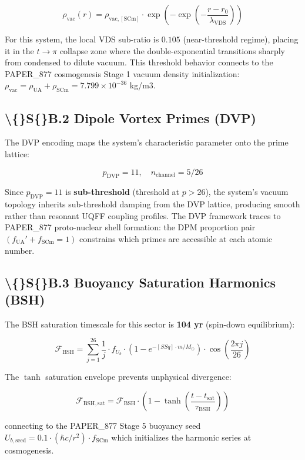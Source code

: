 \documentclass[11pt]{article}
\begin{document}
$$\rho_{\mathrm{vac}}(r) = \rho_{\mathrm{vac,[SCm]}} \cdot \exp\!\left(-\exp\!\left(-\frac{r - r_0}{\lambda_{\mathrm{VDS}}}\right)\right)$$

For this system, the local VDS sub-ratio is $0.105$ (near-threshold regime), placing it in the $t \to \pi$ collapse zone where the double-exponential transitions sharply from condensed to dilute vacuum. This threshold behavior connects to the PAPER\_877 cosmogenesis Stage 1 vacuum density initialization: $\rho_{\mathrm{vac}} = \rho_{\mathrm{UA}} + \rho_{\mathrm{SCm}} = 7.799 \times 10^{-36}$ kg/m3.

\subsection*{\textbackslash\{\}S\{\}B.2 Dipole Vortex Primes (DVP)}

The DVP encoding maps the system's characteristic parameter onto the prime lattice:

$$p_{\mathrm{DVP}} = 11, \quad n_{\mathrm{channel}} = 5/26$$

Since $p_{\mathrm{DVP}} = 11$ is \textbf{sub-threshold} (threshold at $p > 26$), the system's vacuum topology inherits sub-threshold damping from the DVP lattice, producing smooth rather than resonant UQFF coupling profiles. The DVP framework traces to PAPER\_877 proto-nuclear shell formation: the DPM proportion pair $(f_{\mathrm{UA}}' + f_{\mathrm{SCm}} = 1)$ constrains which primes are accessible at each atomic number.

\subsection*{\textbackslash\{\}S\{\}B.3 Buoyancy Saturation Harmonics (BSH)}

The BSH saturation timescale for this sector is \textbf{104 yr} (spin-down equilibrium):

$$\mathcal{F}_{\mathrm{BSH}} = \sum_{j=1}^{26} \frac{1}{j} \cdot f_U_b \cdot \left(1 - e^{-[SSq] \cdot m/M_\odot}\right) \cdot \cos\!\left(\frac{2\pi j}{26}\right)$$

The $\tanh$ saturation envelope prevents unphysical divergence:

$$\mathcal{F}_{\mathrm{BSH,sat}} = \mathcal{F}_{\mathrm{BSH}} \cdot \left(1 - \tanh\!\left(\frac{t - t_{\mathrm{sat}}}{\tau_{\mathrm{BSH}}}\right)\right)$$

connecting to the PAPER\_877 Stage 5 buoyancy seed $U_{b,\mathrm{seed}} = 0.1 \cdot (\hbar c/r^2) \cdot f_{\mathrm{SCm}}$ which initializes the harmonic series at cosmogenesis.
\end{document}
